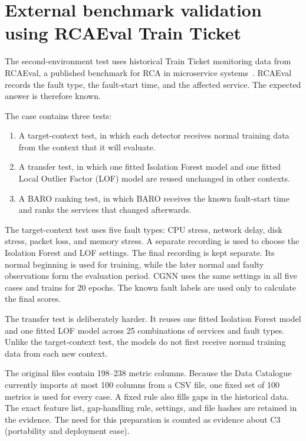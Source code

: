 \section{External benchmark validation using RCAEval Train Ticket}
\label{sec:external_benchmark_case}

The second-environment test uses historical Train Ticket monitoring data from RCAEval, a published benchmark for RCA in microservice systems~\cite{pham2025rcaeval}. RCAEval records the fault type, the fault-start time, and the affected service. The expected answer is therefore known.

The case contains three tests:
\begin{enumerate}
    \item A target-context test, in which each detector receives normal training data from the context that it will evaluate.
    \item A transfer test, in which one fitted Isolation Forest model and one fitted Local Outlier Factor (LOF) model are reused unchanged in other contexts.
    \item A BARO ranking test, in which BARO receives the known fault-start time and ranks the services that changed afterwards.
\end{enumerate}

The target-context test uses five fault types: CPU stress, network delay, disk stress, packet loss, and memory stress. A separate recording is used to choose the Isolation Forest and LOF settings. The final recording is kept separate. Its normal beginning is used for training, while the later normal and faulty observations form the evaluation period. CGNN uses the same settings in all five cases and trains for 20 epochs. The known fault labels are used only to calculate the final scores.

The transfer test is deliberately harder. It reuses one fitted Isolation Forest model and one fitted LOF model across 25 combinations of services and fault types. Unlike the target-context test, the models do not first receive normal training data from each new context.

The original files contain 198--238 metric columns. Because the Data Catalogue currently imports at most 100 columns from a CSV file, one fixed set of 100 metrics is used for every case. A fixed rule also fills gaps in the historical data. The exact feature list, gap-handling rule, settings, and file hashes are retained in the evidence. The need for this preparation is counted as evidence about C3 (portability and deployment ease).

